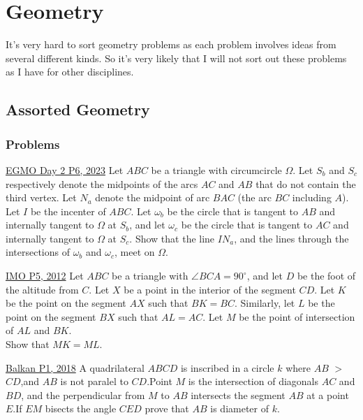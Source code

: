 \chapter{Geometry}
\indent It's very hard to sort geometry problems as each problem involves ideas from several different kinds. So it's very likely that I will not sort out these problems as I have for other disciplines.

\section{Assorted Geometry}
\subsection{Problems}
\begin{problem}{1}{\href{https://artofproblemsolving.com/community/c6h3054399p27522960}{EGMO Day 2 P6, 2023}}
	Let $ABC$ be a triangle with circumcircle $\Omega$. Let $S_b$ and $S_c$ respectively denote the midpoints of the arcs $AC$ and $AB$ that do not contain the third vertex. Let $N_a$ denote the midpoint of arc $BAC$ (the arc $BC$ including $A$). Let $I$ be the incenter of $ABC$. Let $\omega_b$ be the circle that is tangent to $AB$ and internally tangent to $\Omega$ at $S_b$, and let $\omega_c$ be the circle that is tangent to $AC$ and internally tangent to $\Omega$ at $S_c$. Show that the line $IN_a$, and the lines through the intersections of $\omega_b$ and $\omega_c$, meet on $\Omega$.
\end{problem}

\begin{problem}{2}{\href{https://artofproblemsolving.com/community/c6h488511p2737425}{IMO P5, 2012}} 
	Let $ABC$ be a triangle with $\angle BCA=90^{\circ}$, and let $D$ be the foot of the altitude from $C$. Let $X$ be a point in the interior of the segment $CD$. Let $K$ be the point on the segment $AX$ such that $BK=BC$. Similarly, let $L$ be the point on the segment $BX$ such that $AL=AC$. Let $M$ be the point of intersection of $AL$ and $BK$.\\
	Show that $MK=ML$.
\end{problem}

\begin{problem}{3}{\href{https://artofproblemsolving.com/community/u571929h1640635p35544553}{Balkan P1, 2018}} 
	A quadrilateral $ABCD$ is inscribed in a circle $k$ where $AB$ $>$ $CD$,and $AB$ is not paralel to $CD$.Point $M$ is the intersection of diagonals $AC$ and $BD$, and the perpendicular from $M$ to $AB$ intersects the segment $AB$ at a point $E$.If $EM$ bisects the angle $CED$ prove that $AB$ is diameter of $k$.
\end{problem}

